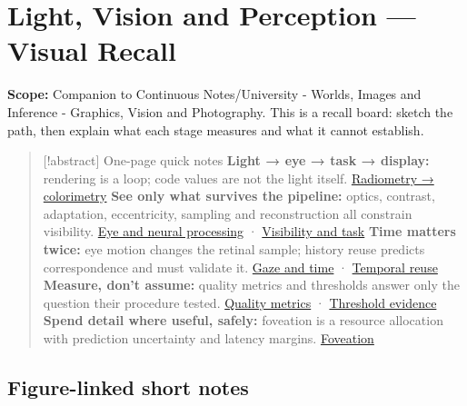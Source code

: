 \hypertarget{appendix-73c6b8ed5a87}{}\label{referencestart:appendix-73c6b8ed5a87}
\section{Light, Vision and Perception --- Visual Recall}\label{appendix-73c6b8ed5a87-light-vision-and-perception-visual-recall}

\hypertarget{appendix-73c6b8ed5a87-light-vision-and-perception-visual-recall}{}

\textbf{Scope:} Companion to {Continuous Notes/University - Worlds, Images and Inference - Graphics, Vision and Photography}. This is a recall board: sketch the path, then explain what each stage measures and what it cannot establish.

\begin{quote}
{[}!abstract{]} One-page quick notes \textbf{Light → eye → task → display:} rendering is a loop; code values are not the light itself. \hyperref[04-visual-computing-ii-ch042-light-must-become-a-quantity-before-it-becomes-a-color]{Radiometry → colorimetry} \textbf{See only what survives the pipeline:} optics, contrast, adaptation, eccentricity, sampling and reconstruction all constrain visibility. \hyperref[04-visual-computing-ii-ch042-the-eye-is-an-optical-instrument-with-neural-processing-inside-it]{Eye and neural processing} · \hyperref[04-visual-computing-ii-ch042-visibility-is-about-contrast-conditions-and-tasks]{Visibility and task} \textbf{Time matters twice:} eye motion changes the retinal sample; history reuse predicts correspondence and must validate it. \hyperref[04-visual-computing-ii-ch042-a-gaze-sample-needs-a-time-as-well-as-a-direction]{Gaze and time} · \hyperref[04-visual-computing-ii-ch042-temporal-reconstruction-is-an-inference-about-correspondence]{Temporal reuse} \textbf{Measure, don't assume:} quality metrics and thresholds answer only the question their procedure tested. \hyperref[04-visual-computing-ii-ch042-quality-numbers-need-a-question-they-can-actually-answer]{Quality metrics} · \hyperref[04-visual-computing-ii-ch042-a-threshold-is-evidence-from-a-procedure-not-a-universal-border]{Threshold evidence} \textbf{Spend detail where useful, safely:} foveation is a resource allocation with prediction uncertainty and latency margins. \hyperref[04-visual-computing-ii-ch042-foveation-is-allocation-under-uncertain-perception-and-timing]{Foveation}
\end{quote}

\subsection{Figure-linked short notes}\label{appendix-73c6b8ed5a87-figure-linked-short-notes}

